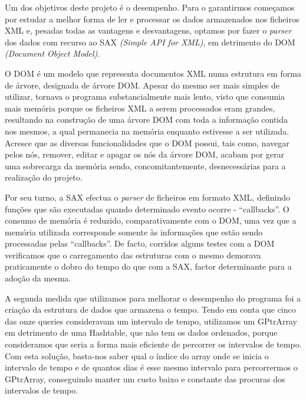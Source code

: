 \documentclass[a4paper]{article}
\begin{document}
Um dos objetivos deste projeto é o desempenho. Para o garantirmos começamos por
estudar a melhor forma de ler e processar os dados armazenados
nos ficheiros XML e, pesadas todas as vantagens e desvantagens, optamos por fazer o
\textit{parser} dos dados com recurso ao SAX \textit{(Simple API for XML)},
em detrimento do DOM \textit{(Document Object Model)}. \par
O DOM é um modelo que representa documentos XML numa estrutura
em forma de árvore, designada de árvore DOM. Apesar do mesmo ser mais simples de utilizar,
tornava o programa substancialmente mais lento, visto que consumia mais memória porque os ficheiros
XML a serem processados eram grandes, resultando na construção de uma árvore DOM com toda a informação
contida nos mesmos, a qual permanecia na memória enquanto estivesse a ser utilizada. Acresce que
as diversas funcionalidades que o DOM possui, tais como, navegar pelos nós, remover, editar e apagar
os nós da árvore DOM, acabam por gerar uma sobrecarga da memória sendo, concomitantemente,
desnecessárias para a realização do projeto. \par
Por seu turno, a SAX efectua o \textit{parser} de ficheiros em formato XML, definindo
funções que são executadas quando determinado evento ocorre - ``callbacks''. O consumo de memória
é reduzido, comparativamente com o DOM, uma vez que a memória utilizada corresponde somente às
informações que estão sendo processadas pelas ``callbacks''. De facto, corridos alguns testes com
a DOM verificamos que o carregamento das estruturas com o mesmo demorava praticamente o dobro do
tempo do que com a SAX, factor determinante para a adoção da mesma. \par

A segunda medida que utilizamos para melhorar o desempenho do programa foi a criação
da estrutura de dados que armazena o tempo. Tendo em conta que cinco das onze queries
consideravam um intervalo de tempo, utilizamos um GPtrArray em detrimento de uma
Hashtable, que não tem os dados ordenados, porque consideramos que seria a forma mais
eficiente de percorrer os intervalos de tempo. Com esta solução, basta-nos saber qual
o índice do array onde se inicia o intervalo de tempo e de quantos dias é esse mesmo
intervalo para percorrermos o GPtrArray, conseguindo manter um custo baixo e constante
das procuras dos intervalos de tempo. \par
\end{document}
